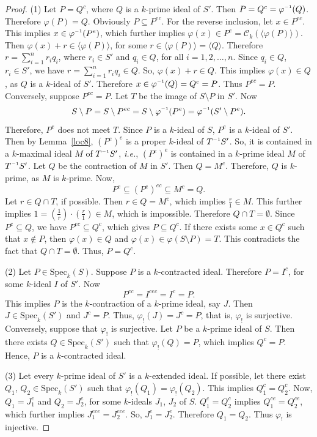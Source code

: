 \documentclass[11pt,english]{amsart}
\newcommand{\inv}{^{\raisebox{.2ex}{$\scriptscriptstyle-1$}}}
\theoremstyle{definition}
\numberwithin{equation}{section}
\begin{document}
\begin{proof}
(1) Let $P=Q^{c}$, where $Q$ is a $k$-prime ideal of $S'$. Then $P=Q^{c}=\varphi\inv(Q)$. Therefore $\varphi(P)=Q$. Obviously $P\subseteq P^{ec}$. For the reverse inclusion, let $x\in P^{ec}$. This implies $x\in \varphi\inv(P^e)$, which further implies $\varphi(x)\in P^{e}=\mathcal{C}_k(\langle \varphi(P)\rangle)$. Then $\varphi(x)+r\in \langle\varphi(P)\rangle$, for some $r\in\langle\varphi(P)\rangle=\langle Q \rangle$. Therefore $r=\sum\limits_{i=1}^n r_iq_i$, where $r_i\in S'$ and $q_i\in Q$, for all $i=1,2,\ldots,n$. Since $q_i\in Q$, $r_i\in S'$, we have $r=\sum\limits_{i=1}^n r_iq_i\in Q$. So, $\varphi(x)+r\in Q$. This implies $\varphi(x)\in Q$, as $Q$ is a $k$-ideal of $S'$. Therefore $x\in \varphi\inv(Q)=Q^c=P$. Thus $P^{ec}=P$.
Conversely, suppose $P^{ec}=P$. Let $T$ be the image of $S\setminus P$ in $S'$. Now \[S\setminus P=S\setminus P^{ec}=S\setminus \varphi\inv(P^e)=\varphi\inv(S'\setminus P^e).\] Therefore, $P^e$ does not meet $T$. Since $P$ is a $k$-ideal of $S$, $P^e$ is a $k$-ideal of $S'$. Then by Lemma~\ref{loc8}, $(P^e)^e$ is a proper $k$-ideal of $T\inv S'$. So, it is contained in a $k$-maximal ideal $M$ of $T\inv S'$, \textit{i.e.}, $(P^e)^e$ is contained in a $k$-prime ideal $M$ of $T\inv S'$. Let $Q$ be the contraction of $M$ in $S'$. Then $Q=M^c$. Therefore, $Q$ is $k$-prime, as $M$ is $k$-prime. Now, \[P^e\subseteq (P^e)^{ec}\subseteq M^c=Q.\] Let $r\in Q\cap T$, if possible. Then $r\in Q=M^c$, which implies $\frac{r}{1}\in M$. This further implies $1=(\frac{1}{r})\cdot(\frac{r}{1})\in M$, which is impossible. Therefore $Q\cap T=\emptyset$. Since $P^e\subseteq Q$, we have $P^{ec}\subseteq Q^c$, which gives $P\subseteq Q^c$. If there exists some $x\in Q^c$ such that $x\notin P$, then $\varphi(x)\in Q$ and $\varphi(x)\in \varphi(S\setminus P)=T$. This contradicts the fact that $Q\cap T=\emptyset$. Thus, $P=Q^c$.

 (2) Let $P\in \mathrm{Spec}_k(S)$. Suppose $P$ is a $k$-contracted ideal. Therefore $P=I^c$, for some $k$-ideal $I$ of $S'$. Now \[P^{ec}=I^{cec}=I^c=P.\] This implies $P$ is the $k$-contraction of a $k$-prime ideal, say $J$. Then $J\in \mathrm{Spec}_k(S')$ and $J^c=P$. Thus, $\varphi_!(J)=J^c=P$, that is,  $\varphi_!$ is surjective.
Conversely, suppose that $\varphi_!$ is surjective. Let $P$ be a $k$-prime ideal of $S$. Then there exists $Q\in \mathrm{Spec}_k(S')$ such that $\varphi_!(Q)=P$, which implies $Q^c=P$. Hence, $P$ is a $k$-contracted ideal.

 (3) Let every $k$-prime ideal of $S'$ is a $k$-extended ideal. If possible, let there exist $Q_1$, $Q_2\in \mathrm{Spec}_k(S')$ such that $\varphi_!(Q_1)=\varphi_!(Q_2)$. This implies $Q_1^c=Q_2^c$. Now, $Q_1=J_1^e$ and $Q_2=J_2^e$, for some $k$-ideals $J_1$, $J_2$ of $S$. $Q_1^c=Q_2^c$ implies $Q_1^{ce}=Q_2^{ce}$, which further implies $J_1^{ece}=J_2^{ece}$. So, $J_1^e=J_2^e$. Therefore $Q_1=Q_2$. Thus $\varphi_!$ is injective.	
\end{proof}
\end{document}
